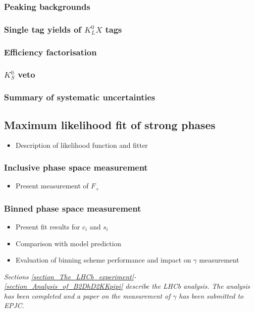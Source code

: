 \documentclass[12pt, a4paper, notitlepage, onecolumn]{article}
\begin{document}
\subsubsection{Peaking backgrounds}
\subsubsection{Single tag yields of \texorpdfstring{$K^0_LX$}{KLX} tags}
\subsubsection{Efficiency factorisation}
\subsubsection{\texorpdfstring{$K^0_S$}{KS0} veto}
\subsubsection{Summary of systematic uncertainties}
\subsection{Maximum likelihood fit of strong phases}
  \begin{itemize}[nosep]
    \setlength{\itemindent}{2em}
    \item[\textendash]{Description of likelihood function and fitter}
  \end{itemize}
\subsubsection{Inclusive phase space measurement}
  \begin{itemize}[nosep]
    \setlength{\itemindent}{2.5em}
    \item[\textasteriskcentered]{Present measurement of $F_+$}
  \end{itemize}
\subsubsection{Binned phase space measurement}
  \begin{itemize}[nosep]
    \setlength{\itemindent}{2.5em}
    \item[\textasteriskcentered]{Present fit results for $c_i$ and $s_i$}
    \item[\textasteriskcentered]{Comparison with model prediction}
    \item[\textasteriskcentered]{Evaluation of binning scheme performance and impact on $\gamma$ measurement}
  \end{itemize}
\leavevmode\newline
\noindent\textit{Sections \ref{section_The_LHCb_experiment}-\ref{section_Analysis_of_B2DhD2KKpipi} describe the LHCb analysis. The analysis has been completed and a paper on the measurement of $\gamma$ has been submitted to EPJC.}
\end{document}
